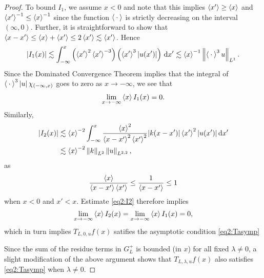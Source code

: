 \documentclass[../dissertation]{subfiles}
\begin{document}
\begin{proof}
	To bound $I_1$, we assume $x < 0$ and note that this implies $\left\langle x' \right\rangle \geq \left\langle x \right\rangle$
	and $\left\langle x' \right\rangle^{-1} \leq \left\langle x \right\rangle^{-1}$
	since the function $\left\langle \kern 0.5ex \cdot \kern 0.5ex \right\rangle$ is strictly decreasing on the interval $(\infty,0)$.
	Further, it is straightforward to show that $\left\langle x-x' \right\rangle\leq\left\langle x \right\rangle + \left\langle x' \right\rangle 
	\leq 2\left\langle x' \right\rangle\lesssim \left\langle x' \right\rangle$. Hence
	\begin{align*}
		|I_1(x)| 
			\lesssim 
				\int_{-\infty}^x 
					\left(\left\langle x' \right\rangle^2 \left\langle x' \right\rangle^{-3}\right) 
					\left(\left\langle x' \right\rangle^3|u(x')|\right) 
				\, \mathrm{d}x'
			\lesssim
				\left\langle x \right\rangle^{-1} 
				\left\| \left\langle \kern 0.5ex \cdot \kern 0.5ex \right\rangle^3 u \right\|_{L^1}.
	\end{align*}
	Since the Dominated Convergence Theorem implies that the integral of
	$\left\langle \kern 0.5ex \cdot \kern 0.5ex \right\rangle^3 |u| \, \chi_{(-\infty, x)}$ goes to zero as $x\to-\infty$, 
	we see that
	\begin{align*}
		\lim_{x\to-\infty} \left\langle x \right\rangle I_1(x) = 0.
	\end{align*}
	Similarly,
	\begin{align}\label{eq2:I2}
		|I_2(x)| 
			&\lesssim
				\left\langle x \right\rangle^{-2} 
				\int_{-\infty}^x 
					\frac{\left\langle x \right\rangle^2}{\left\langle x-x' \right\rangle^2 \left\langle x' \right\rangle^2}
					|k(x-x')| \left\langle x' \right\rangle^2 |u(x')| 
				\, \mathrm{d}x' 
				\\
			&\lesssim 
				\left\langle x \right\rangle^{-2} \left\| k \right\|_{L^2} \left\| u \right\|_{L^{2,2}},
				\nonumber
	\end{align}
	as 
	\[
		\frac{\left\langle x \right\rangle}{\left\langle x-x' \right\rangle \left\langle x' \right\rangle} \leq \frac{1}{\left\langle x-x' \right\rangle} \leq 1
	\] 
	when $x <0$ and $x' < x$. Estimate \eqref{eq2:I2} therefore implies
	\[
		\lim_{x\to -\infty} \left\langle x \right\rangle I_2(x)
			= \lim_{x\to -\infty} \left\langle x \right\rangle I_1(x)
			= 0,
	\]
	which in turn implies $T_{L,0,u} f(x)$ satifies the asymptotic
	condition \eqref{eq2:Tasymp}

	Since the sum of the residue terms in $G_L^+$ is bounded (in $x$)
	for all fixed $\lambda \ne 0$, a slight modification of the above 
	argument shows that $T_{L,\lambda, u}f(x)$ also satisfies 
	\eqref{eq2:Tasymp} when $\lambda \ne 0$. 
\end{proof}
\end{document}

